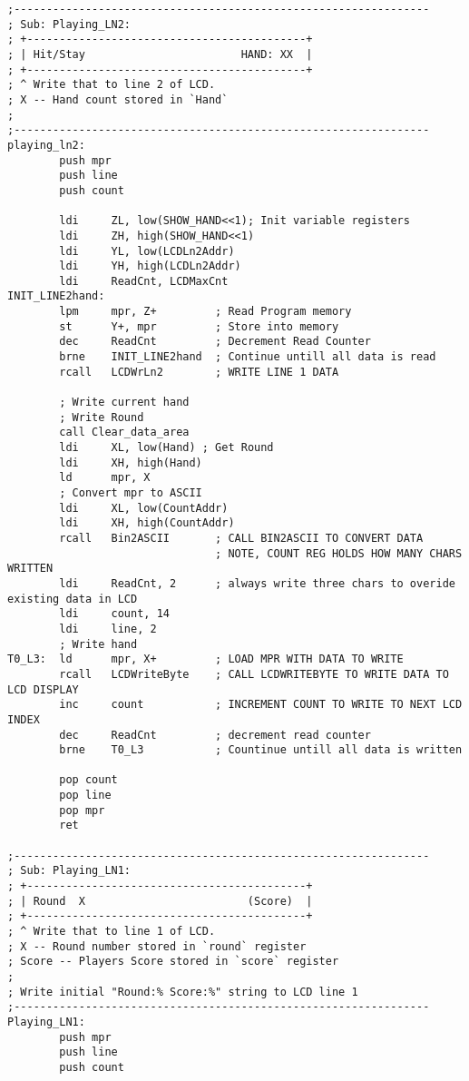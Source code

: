 \documentclass[10pt,letterpaper]{article}
\begin{document}
\begin{verbatim}
;----------------------------------------------------------------
; Sub: Playing_LN2:
; +-------------------------------------------+
; | Hit/Stay                        HAND: XX  |
; +-------------------------------------------+
; ^ Write that to line 2 of LCD.
; X -- Hand count stored in `Hand`
;
;----------------------------------------------------------------
playing_ln2:
        push mpr
        push line
        push count

		ldi		ZL, low(SHOW_HAND<<1); Init variable registers
		ldi		ZH, high(SHOW_HAND<<1)
		ldi		YL, low(LCDLn2Addr)
		ldi		YH, high(LCDLn2Addr)
		ldi		ReadCnt, LCDMaxCnt
INIT_LINE2hand:
        lpm		mpr, Z+			; Read Program memory
        st		Y+, mpr			; Store into memory
        dec		ReadCnt			; Decrement Read Counter
        brne	INIT_LINE2hand	; Continue untill all data is read
        rcall	LCDWrLn2		; WRITE LINE 1 DATA

        ; Write current hand
        ; Write Round
        call Clear_data_area
		ldi		XL, low(Hand) ; Get Round
		ldi		XH, high(Hand)
        ld      mpr, X
        ; Convert mpr to ASCII
		ldi		XL, low(CountAddr)
		ldi		XH, high(CountAddr)
		rcall	Bin2ASCII		; CALL BIN2ASCII TO CONVERT DATA
								; NOTE, COUNT REG HOLDS HOW MANY CHARS WRITTEN
		ldi		ReadCnt, 2		; always write three chars to overide existing data in LCD
        ldi     count, 14
        ldi     line, 2
        ; Write hand
T0_L3:	ld		mpr, X+			; LOAD MPR WITH DATA TO WRITE
		rcall	LCDWriteByte	; CALL LCDWRITEBYTE TO WRITE DATA TO LCD DISPLAY
		inc		count			; INCREMENT COUNT TO WRITE TO NEXT LCD INDEX
		dec		ReadCnt			; decrement read counter
		brne	T0_L3			; Countinue untill all data is written

        pop count
        pop line
        pop mpr
        ret

;----------------------------------------------------------------
; Sub: Playing_LN1:
; +-------------------------------------------+
; | Round  X                         (Score)  |
; +-------------------------------------------+
; ^ Write that to line 1 of LCD.
; X -- Round number stored in `round` register
; Score -- Players Score stored in `score` register
;
; Write initial "Round:% Score:%" string to LCD line 1
;----------------------------------------------------------------
Playing_LN1:
        push mpr
        push line
        push count


\end{verbatim}
\end{document}
